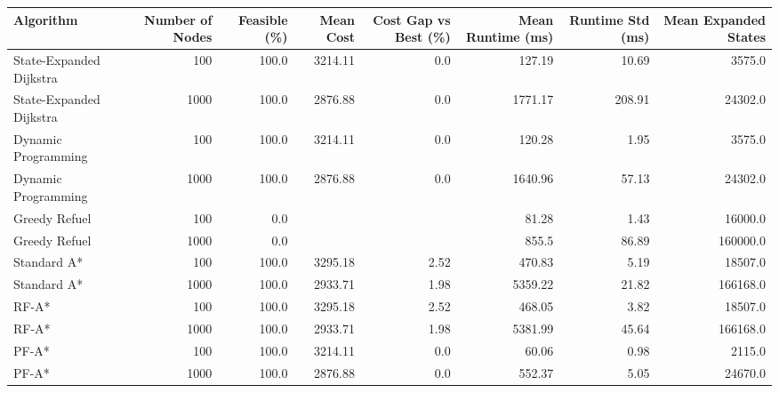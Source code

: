 \begin{tabular}{lrrrrrrr}
\hline
Algorithm & Number of Nodes & Feasible (\%) & Mean Cost & Cost Gap vs Best (\%) & Mean Runtime (ms) & Runtime Std (ms) & Mean Expanded States \\
\hline
State-Expanded Dijkstra & 100 & 100.0 & 3214.11 & 0.0 & 127.19 & 10.69 & 3575.0 \\
State-Expanded Dijkstra & 1000 & 100.0 & 2876.88 & 0.0 & 1771.17 & 208.91 & 24302.0 \\
Dynamic Programming & 100 & 100.0 & 3214.11 & 0.0 & 120.28 & 1.95 & 3575.0 \\
Dynamic Programming & 1000 & 100.0 & 2876.88 & 0.0 & 1640.96 & 57.13 & 24302.0 \\
Greedy Refuel & 100 & 0.0 &  &  & 81.28 & 1.43 & 16000.0 \\
Greedy Refuel & 1000 & 0.0 &  &  & 855.5 & 86.89 & 160000.0 \\
Standard A* & 100 & 100.0 & 3295.18 & 2.52 & 470.83 & 5.19 & 18507.0 \\
Standard A* & 1000 & 100.0 & 2933.71 & 1.98 & 5359.22 & 21.82 & 166168.0 \\
RF-A* & 100 & 100.0 & 3295.18 & 2.52 & 468.05 & 3.82 & 18507.0 \\
RF-A* & 1000 & 100.0 & 2933.71 & 1.98 & 5381.99 & 45.64 & 166168.0 \\
PF-A* & 100 & 100.0 & 3214.11 & 0.0 & 60.06 & 0.98 & 2115.0 \\
PF-A* & 1000 & 100.0 & 2876.88 & 0.0 & 552.37 & 5.05 & 24670.0 \\
\hline
\end{tabular}
